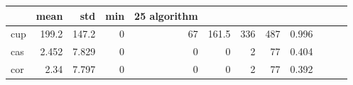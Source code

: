 \begin{tabular}{lrrrrrrrr}
\toprule
 & mean & std & min & 25%
algorithm &  &  &  &  &  &  &  &  \\
\midrule
cup & 199.2 & 147.2 & 0 & 67 & 161.5 & 336 & 487 & 0.996 \\
cas & 2.452 & 7.829 & 0 & 0 & 0 & 2 & 77 & 0.404 \\
cor & 2.34 & 7.797 & 0 & 0 & 0 & 2 & 77 & 0.392 \\
\bottomrule
\end{tabular}
